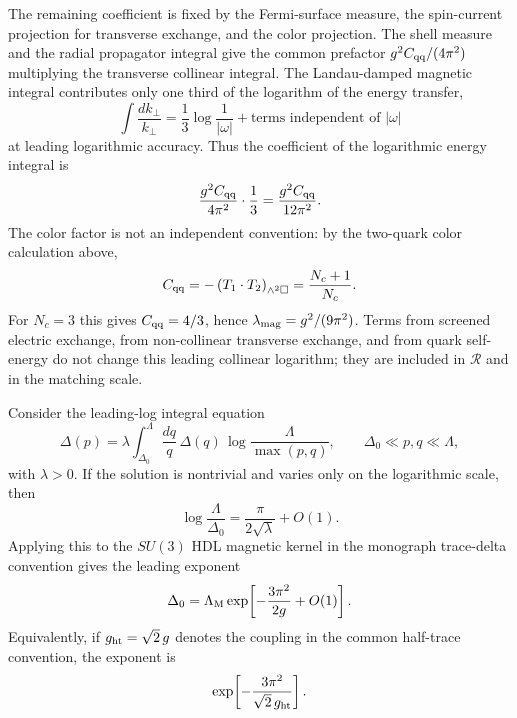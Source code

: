 The remaining coefficient is fixed by the Fermi-surface measure, the
spin-current projection for transverse exchange, and the color projection.
The shell measure and the radial propagator integral give the common
prefactor \(g^2C_{\rm qq}/(4\pi^2)\) multiplying the transverse collinear
integral.  The Landau-damped magnetic integral contributes only one third
of the logarithm of the energy transfer,
\[
  \int\frac{dk_\perp}{k_\perp}
  =
  \frac13\log\frac{1}{|\omega|}
  +\text{terms independent of }|\omega|
\]
at leading logarithmic accuracy.  Thus the coefficient of the logarithmic
energy integral is
\[
  \frac{g^2C_{\rm qq}}{4\pi^2}\cdot\frac13
  =
  \frac{g^2 C_{\rm qq}}{12\pi^2}.
\]
The color factor is not an independent convention: by the two-quark color
calculation above,
\[
  C_{\rm qq}
  =
  -\left(T_1\cdot T_2\right)_{\wedge^2\square}
  =
  \frac{N_c+1}{N_c}.
\]
For \(N_c=3\) this gives \(C_{\rm qq}=4/3\), hence
\(\lambda_{\rm mag}=g^2/(9\pi^2)\).  Terms from screened electric exchange,
from non-collinear transverse exchange, and from quark self-energy do not
change this leading collinear logarithm; they are included in
\(\mathcal R\) and in the matching scale.

\begin{proposition}
\label{prop:qcd-leading-magnetic-gap-exponent}
Consider the leading-log integral equation
\begin{equation}
  \Delta(p)
  =
  \lambda
  \int_{\Delta_0}^{\Lambda}
  \frac{dq}{q}\,
  \Delta(q)\,
  \log\frac{\Lambda}{\max(p,q)},
  \qquad
  \Delta_0\ll p,q\ll\Lambda,
  \label{eq:qcd-abstract-leading-log-gap-equation}
\end{equation}
with \(\lambda>0\).  If the solution is nontrivial and varies only on the
logarithmic scale, then
\begin{equation}
  \log\frac{\Lambda}{\Delta_0}
  =
  \frac{\pi}{2\sqrt{\lambda}}
  +O(1).
  \label{eq:qcd-leading-log-gap-general-exponent}
\end{equation}
Applying this to the \(SU(3)\) HDL magnetic kernel in the monograph
trace-delta convention gives the leading exponent
\begin{equation}
  \Delta_0
  =
  \Lambda_{\rm M}
  \exp\!\left[-\frac{3\pi^2}{2g}+O(1)\right].
  \label{eq:qcd-leading-magnetic-gap-su3-trace-delta}
\end{equation}
Equivalently, if \(g_{\rm ht}=\sqrt2\,g\) denotes the coupling in the
common half-trace convention, the exponent is
\[
  \exp\!\left[-\frac{3\pi^2}{\sqrt2\,g_{\rm ht}}\right].
\]
\end{proposition}

